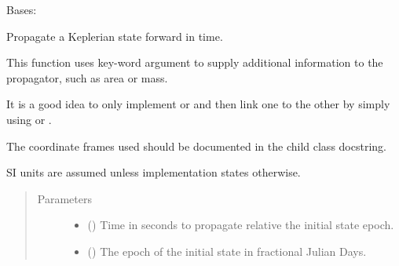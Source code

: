\documentclass[letterpaper,10pt,english]{sphinxmanual}
\begin{document}
\begin{fulllineitems}
\label{\detokenize{modules/propagator_base:propagator_base.PropagatorBase}}
Bases: 

\begin{fulllineitems}
\label{\detokenize{modules/propagator_base:propagator_base.PropagatorBase.get_orbit}}
Propagate a Keplerian state forward in time.

This function uses key-word argument to supply additional information to the propagator, such as area or mass.

It is a good idea to only implement {\hyperref[\detokenize{modules/propagator_base:propagator_base.PropagatorBase.get_orbit}]{}} or {\hyperref[\detokenize{modules/propagator_base:propagator_base.PropagatorBase.get_orbit_cart}]{}} and then link one to the other by simply using {\hyperref[\detokenize{modules/dpt_tools:dpt_tools.kep2cart}]{}} or {\hyperref[\detokenize{modules/dpt_tools:dpt_tools.cart2kep}]{}}.

The coordinate frames used should be documented in the child class docstring.

SI units are assumed unless implementation states otherwise.
\begin{quote}\begin{description}
\item[{Parameters}] \leavevmode\begin{itemize}
\item {} 
 () \textendash{} Time in seconds to propagate relative the initial state epoch.

\item {} 
 () \textendash{} The epoch of the initial state in fractional Julian Days.


\end{itemize}
\end{description}
\end{quote}
\end{fulllineitems}
\end{fulllineitems}
\end{document}
